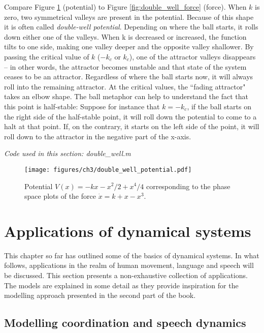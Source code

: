 Compare Figure \ref{fig:double_well_potential} (potential) to Figure \ref{fig:double_well_force} (force). When $k$ is zero, two symmetrical valleys are present in the potential. Because of this shape it is often called \emph{double-well potential}. Depending on where the ball starts, it rolls down either one of the valleys. When k is decreased or increased, the function tilts to one side, making one valley deeper and the opposite valley shallower. By passing the critical value of $k$ ($-k_c$ or $k_c$), one of the attractor valleys disappears -- in other words, the attractor becomes unstable and that state of the system ceases to be an attractor. Regardless of where the ball starts now, it will always roll into the remaining attractor. At the critical values, the ``fading attractor" takes an elbow shape. The ball metaphor can help to understand the fact that this point is half-stable: Suppose for instance that $k = -k_c$, if the ball starts on the right side of the half-stable point, it will roll down the potential to come to a halt at that point. If, on the contrary, it starts on the left side of the point, it will roll down to the attractor in the negative part of the x-axis. 

\medskip\noindent \textit{Code used in this section: double\_well.m}

\begin{figure}[b]
\texttt{[image: figures/ch3/double\_well\_potential.pdf]}
\caption{Potential $V(x) = - kx - x^2/2 + x^4/4$ corresponding to the phase space plots of the force $\dot{x} = k + x - x^3$.}
\label{fig:double_well_potential}
\end{figure}

\section{Applications of dynamical systems}

This chapter so far has outlined some of the basics of dynamical systems. In what follows, applications in the realm of human movement, language and speech will be discussed. This section presents a non-exhaustive collection of applications. The models are explained in some detail as they provide inspiration for the modelling approach presented in the second part of the book.

\subsection{Modelling coordination and speech dynamics}

